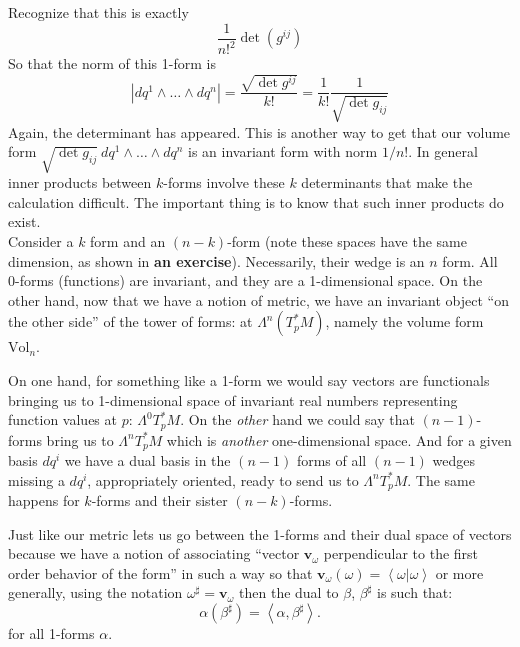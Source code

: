 \documentclass[../master.tex]{subfiles}
\begin{document}
	Recognize that this is exactly 
	\begin{equation}
		\frac{1}{n!^2} \det(g^{ij})
	\end{equation}
	So that the norm of this 1-form is
	\begin{equation}
		|dq^1 \wedge \dots \wedge dq^n| = \frac{\sqrt{\det g^{ij}}}{k!} = \frac{1}{k!} \frac{1}{\sqrt{\det{g_{ij}}}}
	\end{equation}
	Again, the determinant has appeared. This is another way to get that our volume form $\sqrt{\det g_{ij}} ~ dq^1 \wedge \dots \wedge dq^n$ is an invariant form with norm $1/n!$. In general inner products between $k$-forms involve these $k$ determinants that make the calculation difficult. The important thing is to know that such inner products do exist.\\
	
	Consider a $k$ form and an $(n-k)$-form (note these spaces have the same dimension, as shown in \textbf{an exercise}). Necessarily, their wedge is an $n$ form. All 0-forms (functions) are invariant, and they are a 1-dimensional space. On the other hand, now that we have a notion of metric, we have an invariant object ``on the other side'' of the tower of forms: at $\Lambda^n (T^*_p M)$, namely the volume form $\mathrm{Vol}_n$. 
	
	On one hand, for something like a 1-form we would say vectors are functionals bringing us to 1-dimensional space of invariant real numbers representing function values at $p$: $\Lambda^0 T^*_p M$. On the \emph{other} hand we could say that $(n-1)$-forms bring us to $\Lambda^n T^*_p M$ which is \emph{another} one-dimensional space. And for a given basis $dq^i$ we have a dual basis in the $(n-1)$ forms of all $(n-1)$ wedges missing a $dq^i$, appropriately oriented, ready to send us to $\Lambda^n T^*_p M$. The same happens for $k$-forms and their sister $(n-k)$-forms.
	
	Just like our metric lets us go between the 1-forms and their dual space of vectors because we have a notion of associating ``vector $\mathbf v_\omega$ perpendicular to the first order behavior of the form'' in such a way so that $\mathbf v_\omega(\omega) = \left< \omega | \omega \right>$ or more generally, using the notation $\omega^\sharp = \mathbf v_\omega$ then the dual to $\beta$, $\beta^\sharp$ is such that: 
	\begin{equation}
		\alpha(\beta^\sharp) = \left< \alpha, \beta^\sharp \right>.
	\end{equation}
	for all 1-forms $\alpha$.
		
\end{document}

